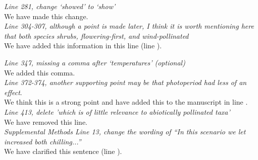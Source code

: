 \documentclass[11pt]{article}
\begin{document}
\emph{Line 281, change `showed' to `show'}\\

\noindent We have made this change.\\

\emph{Line 304-307, although a point is made later, I think it is worth mentioning here that both species shrubs, flowering-first, and wind-pollinated}\\

\noindent We have added this information in this line (line ).

\emph{Line 347, missing a comma after `temperatures' (optional)}\\

\noindent We added this comma.\\

\emph{Line 372-374, another supporting point may be that photoperiod had less of an effect}.\\

\noindent We think this is a strong point and have added this to the manuscript in line .\\


\emph{Line 413, delete 'which is of little relevance to abiotically pollinated taxa'}\\

\noindent We have removed this line.\\

\emph{Supplemental Methods Line 13, change the wording of ``In this scenario we let increased both chilling...''}\\

\noindent We have clarified this sentence (line ). \\

 
\end{document}
